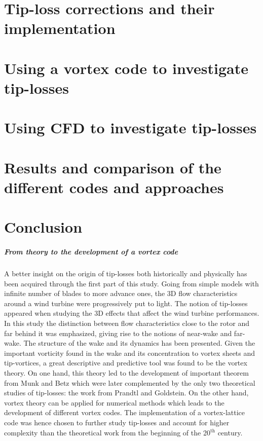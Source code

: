 \documentclass[a4paper,11pt]{book}
\begin{document}
\chapter{Tip-loss corrections and their implementation}



\chapter{Using a vortex code to investigate tip-losses}
\label{chap:vortexcodetiploss}



\chapter{Using CFD to investigate tip-losses}
\label{chap:cfdtiploss}


\chapter{Results and comparison of the different codes and approaches}
\label{chap:resultsandcomparisons}





\clearpage\newpage
\chapter*{Conclusion}

\paragraph{From theory to the development of a vortex code} A better insight on the origin of tip-losses both historically and physically has been acquired through the first part of this study. Going from simple models with infinite number of blades to more advance ones, the 3D flow characteristics around a wind turbine were progressively put to light. The notion of tip-losses appeared when studying the 3D effects that affect the wind turbine performances. In this study the distinction between flow characteristics close to the rotor and far behind it was emphasized, giving rise to the notions of near-wake and far-wake. The structure of the wake and its dynamics has been presented. Given the important vorticity found in the wake and its concentration to vortex sheets and tip-vortices, a great descriptive and predictive tool was found to be the vortex theory. On one hand, this theory led to the development of important theorem from Munk and Betz which were later complemented by the only two theoretical studies of tip-losses: the work from Prandtl and Goldstein. On the other hand, vortex theory can be applied for numerical methods which leads to the development of different vortex codes. The implementation of a vortex-lattice code was hence chosen to further study tip-losses and account for higher complexity than the theoretical work from the beginning of the 20$^\text{th}$ century.
\end{document}
